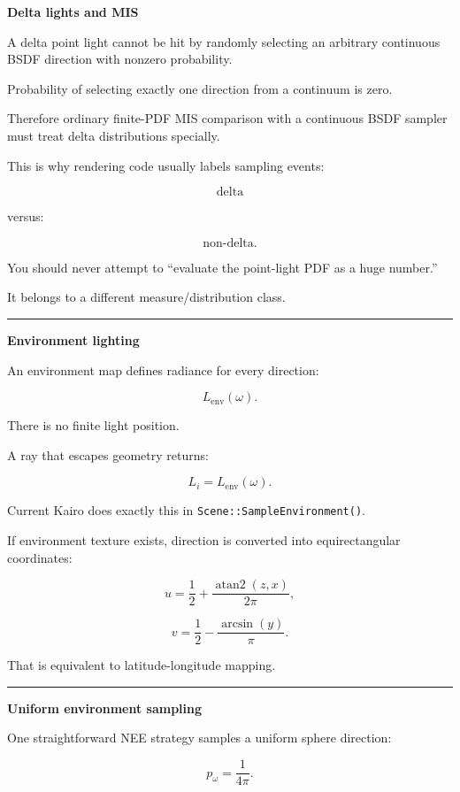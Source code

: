 \textbf{Delta lights and MIS}

A delta point light cannot be hit by randomly selecting an arbitrary continuous BSDF direction with nonzero probability.

Probability of selecting exactly one direction from a continuum is zero.

Therefore ordinary finite-PDF MIS comparison with a continuous BSDF sampler must treat delta distributions specially.

This is why rendering code usually labels sampling events:

\[
\text{delta}
\]

versus:

\[
\text{non-delta}.
\]

You should never attempt to ``evaluate the point-light PDF as a huge number.''

It belongs to a different measure/distribution class.

\begin{center}\rule{0.5\linewidth}{0.5pt}\end{center}

\textbf{Environment lighting}

An environment map defines radiance for every direction:

\[
L_{\text{env}}(\omega).
\]

There is no finite light position.

A ray that escapes geometry returns:

\[
\boxed{
L_i=
L_{\text{env}}(\omega).
}
\]

Current Kairo does exactly this in \texttt{Scene::SampleEnvironment()}.

If environment texture exists, direction is converted into equirectangular coordinates:

\[
u=
\frac12+
\frac{
\operatorname{atan2}(z,x)
}{
2\pi
},
\]

\[
v=
\frac12-
\frac{
\arcsin(y)
}{
\pi
}.
\]

That is equivalent to latitude-longitude mapping.

\begin{center}\rule{0.5\linewidth}{0.5pt}\end{center}

\textbf{Uniform environment sampling}

One straightforward NEE strategy samples a uniform sphere direction:

\[
p_\omega
=
\frac1{4\pi}.
\]

